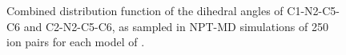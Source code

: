 \documentclass[3p,twocolumn]{elsarticle}
\begin{document}
\begin{figure}
\centering
{}%
%
  
%
%
\caption{Combined distribution function of the dihedral angles of C1-N2-C5-C6 and C2-N2-C5-C6, as sampled in NPT-MD simulations of 250 ion pairs for each model of \ce{[emim][B(CN)_4]}.}
\label{fig:dihedrals_emim}
\end{figure}
\end{document}
